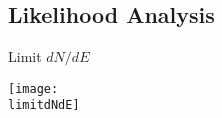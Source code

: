 \documentclass[titlepage]{article}
\begin{document}
\subsection{Likelihood Analysis}
\results
\pagebreak

\backgroundpdfplot

\survivialfunctionplot

\pagebreak
{
  \centering

  {\Large Limit $dN/dE$}

  \texttt{[image: \\limitdNdE]}
  \\
  \\

  \tsd

  \\
  \\
  \upperlim
}

\vfill        
\end{document}
